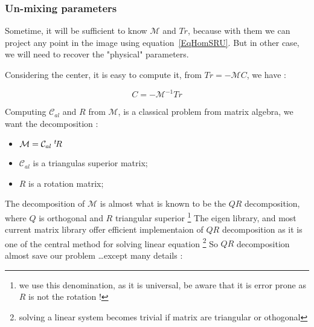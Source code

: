 \subsubsection{Un-mixing parameters}

Sometime, it will be sufficient to know $\mathcal{M}$ and $Tr$, because
with them we can project any point in the image using equation~\ref{EqHomSRU}.
But in other case, we will need to recover the "physical" parameters.

Considering the center, it is easy to compute it, from $Tr = -\mathcal{M} C$, we have :

\begin{equation}
     C= - \mathcal{M}^{-1} Tr
\end{equation}

Computing $\mathcal{C}_{al}$ and $R$ from $\mathcal{M}$, is a classical problem
from matrix algebra, we want the decomposition :

\begin{itemize}
    \item   $\mathcal{M} = \mathcal{C}_{al} \; ^{t} \! R $
    \item   $\mathcal{C}_{al} $  is a triangulas superior matrix;
    \item   $R $  is a rotation matrix;
\end{itemize}

The decomposition of $\mathcal{M}$ is almost what is known to
be the $QR$ decomposition, where $Q$ is orthogonal and $R$ triangular superior
\footnote{we use this  denomination, as it is universal, be aware that it is
error prone as $R$ is not the rotation !}
The eigen library, and most current matrix library offer efficient implementaion
of $QR$ decomposition as it is one of the central method for solving linear
equation \footnote{solving a linear system becomes trivial if matrix are
triangular or othogonal}
So $QR$ decomposition almost save our problem \dots except many details :


